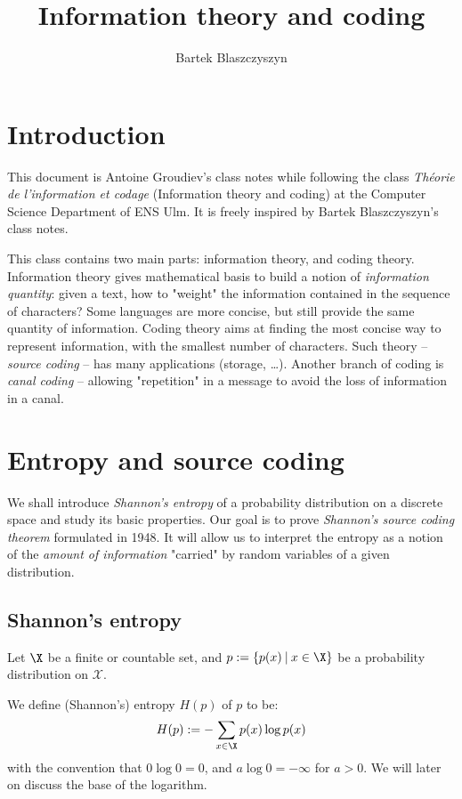 \documentclass[toc, titlepaged]{../cs-classes/cs-classes}
\title{Information theory and coding}
\author{Bartek Blaszczyszyn}
\begin{document}
\section*{Introduction}
This document is Antoine Groudiev's class notes while following the class \emph{Théorie de l'information et codage} (Information theory and coding) at the Computer Science Department of ENS Ulm. It is freely inspired by Bartek Blaszczyszyn's class notes. 

This class contains two main parts: information theory, and coding theory. Information theory gives mathematical basis to build a notion of \emph{information quantity}: given a text, how to "weight" the information contained in the sequence of characters? Some languages are more concise, but still provide the same quantity of information. Coding theory aims at finding the most concise way to represent information, with the smallest number of characters. Such theory -- \emph{source coding} -- has many applications (storage, \dots). Another branch of coding is \emph{canal coding} -- allowing "repetition" in a message to avoid the loss of information in a canal.

\section{Entropy and source coding}
We shall introduce \emph{Shannon’s entropy} of a probability distribution on a discrete space and study its basic properties. Our goal is to prove \emph{Shannon’s source coding theorem} formulated in 1948. It will allow us to interpret the entropy as a notion of the \emph{amount of information} "carried" by random variables of a given distribution.

\subsection{Shannon's entropy}
Let $\X$ be a finite or countable set, and $p := \{p(x) \: | \: x\in \X \}$ be a probability distribution on $\mathcal{X}$.

\begin{definition} We define (Shannon's) entropy $H(p)$ of $p$ to be:
\begin{equation}
    H(p) := -\sum_{x\in\X}p(x)\log p(x)
\end{equation}
with the convention that $0\log 0 = 0$, and $a\log 0 = -\infty$ for $a>0$.
We will later on discuss the base of the logarithm.
\end{definition}
\end{document}
